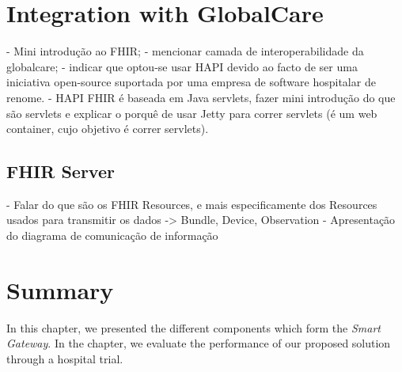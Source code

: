 \section{Integration with GlobalCare}

- Mini introdução ao FHIR;
- mencionar camada de interoperabilidade da globalcare;
- indicar que optou-se usar HAPI devido ao facto de ser uma iniciativa open-source suportada por uma empresa de software hospitalar de renome.
- HAPI FHIR é baseada em Java servlets, fazer mini introdução do que são servlets e explicar o porquê de usar Jetty para correr servlets (é um web container, cujo objetivo é correr servlets). 

\subsection{FHIR Server}

- Falar do que são os FHIR Resources, e mais especificamente dos Resources usados para transmitir os dados -> Bundle, Device, Observation
- Apresentação do diagrama de comunicação de informação

\section{Summary}

In this chapter, we presented the different components which form the \textit{Smart Gateway}. In the chapter, we evaluate the performance of our proposed solution through a hospital trial.
